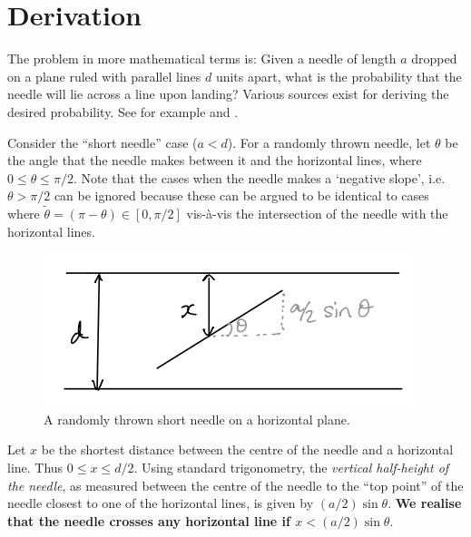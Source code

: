 \documentclass[11pt]{article}
\begin{document}
\section{Derivation}

The problem in more mathematical terms is: Given a needle of length \(a\) dropped on a plane ruled with parallel lines \(d\) units apart, what is the probability that the needle will lie across a line upon landing?
Various sources exist for deriving the desired probability. 
See for example \cite{mantel1953extension} and \cite{duncan1967variation}.

Consider the ``short needle'' case (\(a < d\)). For a randomly thrown needle, let \(\theta\) be the angle that the needle makes between it and the horizontal lines, where \(0\leq \theta \leq \pi/2\). 
Note that the cases when the needle makes a `negative slope', i.e.~\(\theta > \pi/2\) can be ignored because these can be argued to be identical to cases where \(\tilde\theta = (\pi -\theta) \in [0,\pi/2]\) vis-à-vis the intersection of the needle with the horizontal lines.

\begin{figure}[htbp]
\centering 
\includegraphics[width=0.5\linewidth]{figure/buffon2} 
\caption{A randomly thrown short needle on a horizontal plane.}
\label{fig:buffon2}
\end{figure}

Let \(x\) be the shortest distance between the centre of the needle and a horizontal line. 
Thus \(0\leq x \leq d/2\). 
Using standard trigonometry, the \textit{vertical half-height of the needle}, as measured between the centre of the needle to the ``top point'' of the needle closest to one of the horizontal lines, is given by \((a/2)\sin\theta\).
\textbf{We realise that the needle crosses any horizontal line if $x < (a/2)\sin\theta$}.
\end{document}
